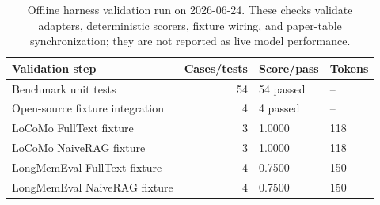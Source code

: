 \begin{table}[t]
    \centering
    \small
    \begin{tabular}{p{}rll}
        \toprule
        Validation step & Cases/tests & Score/pass & Tokens \\
        \midrule
        Benchmark unit tests & 54 & 54 passed & -- \\
        Open-source fixture integration & 4 & 4 passed & -- \\
        LoCoMo FullText fixture & 3 & 1.0000 & 118 \\
        LoCoMo NaiveRAG fixture & 3 & 1.0000 & 118 \\
        LongMemEval FullText fixture & 4 & 0.7500 & 150 \\
        LongMemEval NaiveRAG fixture & 4 & 0.7500 & 150 \\
        \bottomrule
    \end{tabular}
    \caption{Offline harness validation run on 2026-06-24. These
    checks validate adapters, deterministic scorers, fixture wiring,
    and paper-table synchronization; they are not reported as live
    model performance.}
    \label{tab:harness-validation}
\end{table}
